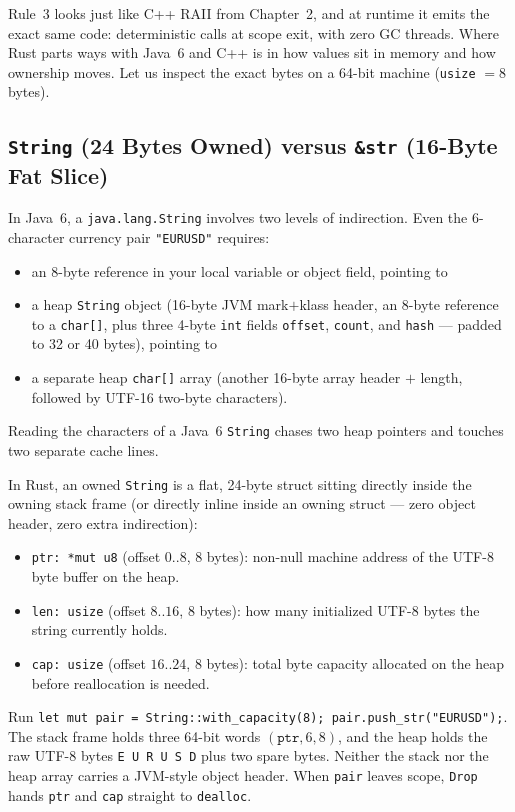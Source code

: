 Rule~3 looks just like C++ RAII from Chapter~2, and at runtime it emits the exact same code: deterministic calls at scope exit, with zero GC threads. Where Rust parts ways with Java~6 and C++ is in how values sit in memory and how ownership moves. Let us inspect the exact bytes on a 64-bit machine (\texttt{usize} $= 8$ bytes).

\subsection{\texttt{String} (24 Bytes Owned) versus \texttt{\&str} (16-Byte Fat Slice)}

In Java~6, a \texttt{java.lang.String} involves two levels of indirection. Even the 6-character currency pair \texttt{"EURUSD"} requires:
\begin{itemize}
  \item an 8-byte reference in your local variable or object field, pointing to
  \item a heap \texttt{String} object (16-byte JVM mark$+$klass header, an 8-byte reference to a \texttt{char[]}, plus three 4-byte \texttt{int} fields \texttt{offset}, \texttt{count}, and \texttt{hash} --- padded to 32 or 40 bytes), pointing to
  \item a separate heap \texttt{char[]} array (another 16-byte array header $+$ length, followed by UTF-16 two-byte characters).
\end{itemize}
Reading the characters of a Java~6 \texttt{String} chases two heap pointers and touches two separate cache lines.

In Rust, an owned \texttt{String} is a flat, 24-byte struct sitting directly inside the owning stack frame (or directly inline inside an owning struct --- zero object header, zero extra indirection):
\begin{itemize}
  \item \texttt{ptr: *mut u8} (offset $0..8$, 8 bytes): non-null machine address of the UTF-8 byte buffer on the heap.
  \item \texttt{len: usize} (offset $8..16$, 8 bytes): how many initialized UTF-8 bytes the string currently holds.
  \item \texttt{cap: usize} (offset $16..24$, 8 bytes): total byte capacity allocated on the heap before reallocation is needed.
\end{itemize}
Run \texttt{let mut pair = String::with\_capacity(8); pair.push\_str("EURUSD");}. The stack frame holds three 64-bit words $(\texttt{ptr}, 6, 8)$, and the heap holds the raw UTF-8 bytes \texttt{E U R U S D} plus two spare bytes. Neither the stack nor the heap array carries a JVM-style object header. When \texttt{pair} leaves scope, \texttt{Drop} hands \texttt{ptr} and \texttt{cap} straight to \texttt{dealloc}.

